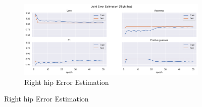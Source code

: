\begin{figure}[!ht]
\begin{subfigure}[b]{0.47\linewidth}
        \label{fig:v2_lehi_jt_ee}
    \end{subfigure}
    \hfill
    \begin{subfigure}[b]{0.47\linewidth}
        \centering
        \includegraphics[width=\textwidth]{figures/Results/v2/jt/Right hip_ErrorEstimation.png}
        \caption{Right hip Error Estimation}
        \label{fig:v2_rihi_jt_ee}
    \end{subfigure}
  \end{figure}
  
